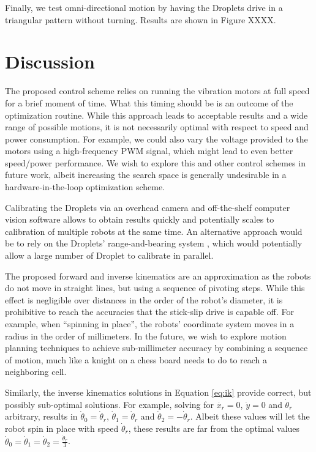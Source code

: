 \documentclass[letterpaper, 10pt, conference]{ieeeconf}
\begin{document}
Finally, we test omni-directional motion by having the Droplets drive in a triangular pattern without turning. Results are shown in Figure XXXX.

\section{Discussion}
The proposed control scheme relies on running the vibration motors at full speed for a brief moment of time. What this timing should be is an outcome of the optimization routine. While this approach leads to acceptable results and a wide range of possible motions, it is not necessarily optimal with respect to speed and power consumption. For example, we could also vary the voltage provided to the motors using a high-frequency PWM signal, which might lead to even better speed/power performance. We wish to explore this and other control schemes in future work, albeit increasing the search space is generally undesirable in a hardware-in-the-loop optimization scheme.  

Calibrating the Droplets via an overhead camera and off-the-shelf computer vision software allows to obtain results quickly and potentially scales to calibration of multiple robots at the same time. An alternative approach would be to rely on the Droplets' range-and-bearing system \cite{farrow14}, which would potentially allow a large number of Droplet to calibrate in parallel.

The proposed forward and inverse kinematics are an approximation as the robots do not move in straight lines, but using a sequence of pivoting steps. While this effect is negligible over distances in the order of the robot's diameter, it is prohibitive to reach the accuracies that the stick-slip drive is capable off. For example, when ``spinning in place'', the robots' coordinate system moves in a radius in the order of millimeters. In the future, we wish to explore motion planning techniques to achieve sub-millimeter accuracy by combining a sequence of motion, much like a knight on a chess board needs to do to reach a neighboring cell. 

Similarly, the inverse kinematics solutions in Equation \ref{eq:ik} provide correct, but possibly sub-optimal solutions. For example, solving for $\dot{x_r}=0$, $\dot{y}=0$ and $\dot{\theta}_r$ arbitrary, results in $\dot{\theta}_0=\dot{\theta}_r$, $\dot{\theta}_1=\dot{\theta}_r$ and $\dot{\theta}_2=-\dot{\theta}_r$. Albeit these values will let the robot spin in place with speed $\dot{\theta}_r$, these results are far from the optimal values $\dot{\theta}_0=\dot{\theta}_1=\dot{\theta}_2=\frac{\dot{\theta}_r}{3}$. 
\end{document}
